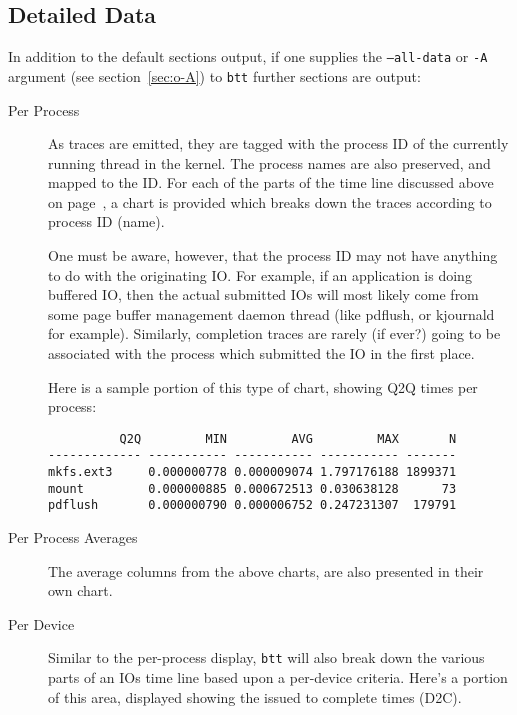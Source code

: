\documentclass{article}
\begin{document}
\subsection{\label{sec:detailed-data}Detailed Data}

  In addition to the default sections output, if one supplies the
  \texttt{--all-data} or \texttt{-A} argument (see section~\ref{sec:o-A})
  to \texttt{btt} further sections are output:

\begin{description}
  \item[Per Process] As traces are emitted, they are tagged with the
  process ID of the currently running thread in the kernel. The process
  names are also preserved, and mapped to the ID. For each of the parts
  of the time line discussed above on page~\pageref{tl-defs}, a chart is
  provided which breaks down the traces according to process ID (name).

  One must be aware, however, that the process ID may not have anything
  to do with the originating IO. For example, if an application is
  doing buffered IO, then the actual submitted IOs will most likely
  come from some page buffer management daemon thread (like pdflush,
  or kjournald for example). Similarly, completion traces are rarely
  (if ever?) going to be associated with the process which submitted
  the IO in the first place.

  Here is a sample portion of this type of chart, showing Q2Q times
  per process:

\begin{verbatim}
          Q2Q         MIN         AVG         MAX       N
------------- ----------- ----------- ----------- -------
mkfs.ext3     0.000000778 0.000009074 1.797176188 1899371
mount         0.000000885 0.000672513 0.030638128      73
pdflush       0.000000790 0.000006752 0.247231307  179791
\end{verbatim}

  \item[Per Process Averages] The average columns from the above charts,
  are also presented in their own chart.

  \item[Per Device] Similar to the per-process display, \texttt{btt}
  will also break down the various parts of an IOs time line based upon a
  per-device criteria. Here's a portion of this area, displayed showing
  the issued to complete times (D2C).


\end{description}
\end{document}
